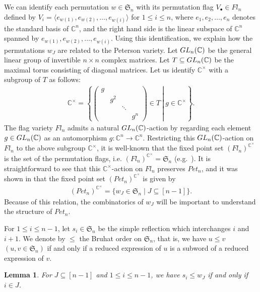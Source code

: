 \documentclass[11pt]{article}
\newtheorem{lemma}[theo]{Lemma}
\theoremstyle{definition}
\numberwithin{equation}{section}
\numberwithin{equation}{section}
\begin{document}
We can identify each permutation $w\in\mathfrak{S}_n$ with its permutation flag $V_{\bullet}\in Fl_n$ defined by $V_i =\langle e_{w(1)}, e_{w(2)},\ldots, e_{w(i)}\rangle$ for $1\le i\le n$, where $e_1,e_2,\ldots,e_n$ denotes the standard basis of ${\mathbb C}^n$, and the right hand side is the linear subspace of ${\mathbb C}^n$ spanned by $e_{w(1)}, e_{w(2)},\ldots, e_{w(i)}$. Using this identification, we explain how the permutations $w_J$ are related to the Peterson variety. Let ${\rm GL}_n({\mathbb C})$ be the general linear group of invertible $n\times n$ complex matrices. Let $T\subseteq {\rm GL}_n({\mathbb C})$ be the maximal torus consisting of diagonal matrices. Let us identify ${\mathbb C}^{\times}$ with a subgroup of $T$ as follows: 
\begin{align}\label{eq: C-starsubgroup}
{\mathbb C}^{\times} = 
\left\{
\left.
\begin{pmatrix}
g & & & \\
 & g^2 & & \\
 & & \ddots & \\
 & & & g^n 
\end{pmatrix}
\in T\ 
\right| \ g\in {\mathbb C}^{\times}
\right\}.
\end{align}
The flag variety $Fl_n$ admits a natural ${\rm GL}_n({\mathbb C})$-action by regarding each element $g\in {\rm GL}_n({\mathbb C})$ as an automorphism $g\colon {\mathbb C}^n\rightarrow {\mathbb C}^n$. Restricting this ${\rm GL}_n({\mathbb C})$-action on $Fl_n$ to the above subgroup ${\mathbb C}^{\times}$, it is well-known that the fixed point set $(Fl_n)^{{\mathbb C}^{\times}}$ is the set of the permutation flags, i.e. $(Fl_n)^{{\mathbb C}^{\times}}=\mathfrak{S}_n$ (e.g.~\cite[proof of Lemma~2 in Sect.~10.1]{fult97}). It is straightforward to see that this ${\mathbb C}^{\times}$-action on $Fl_n$ preserves $Pet_{n}$, and it was shown in \cite{HaTy} that the fixed point set $(Pet_{n})^{{\mathbb C}^{\times}}$ is given by
\begin{align}\label{eq: fixed points of Pet}
(Pet_{n})^{{\mathbb C}^{\times}} =\{w_J \in\mathfrak{S}_n \mid J\subseteq [n-1]\}.
\end{align}
Because of this relation, the combinatorics of $w_J$ will be important to understand the structure of $Pet_{n}$.

For $1\le i\le n-1$, let $s_i\in\mathfrak{S}_n$ be the simple reflection which interchanges $i$ and~$i+1$. We denote by $\le$ the Bruhat order on $\mathfrak{S}_n$, that is, we have $u\le v$ $(u,v\in\mathfrak{S}_n)$ if and only if a reduced expression of $u$ is a subword of a reduced expression of $v$.
\begin{lemma}\label{lem: So-san's lemma 1}
For $J\subseteq[n-1]$ and $1\le i\le n-1$, we have 
$s_i\le w_J$ if and only if $i\in J$.
\end{lemma}
\end{document}
